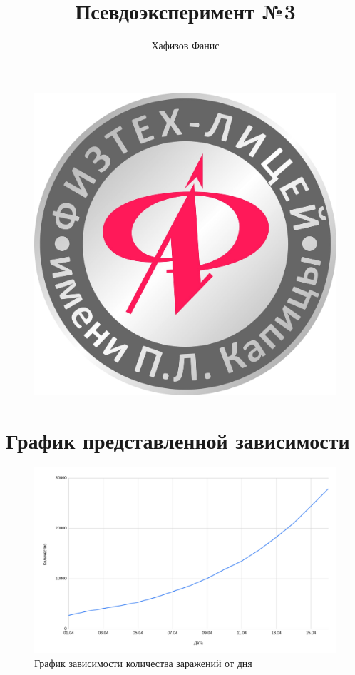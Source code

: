 \documentclass[12pt]{article}
\title{Псевдоэксперимент №3}
\author{Хафизов Фанис}
\begin{document}
	\begin{figure}
		\centering
		\includegraphics[width=0.3\linewidth]{logo}
	\end{figure}
	\maketitle
	\newpage
	\section{График представленной зависимости}
	\begin{figure}[H]
		\centering
		\includegraphics[width=\linewidth]{pand_graph}
		\caption{График зависимости количества заражений от дня}
	\end{figure}
\end{document}
